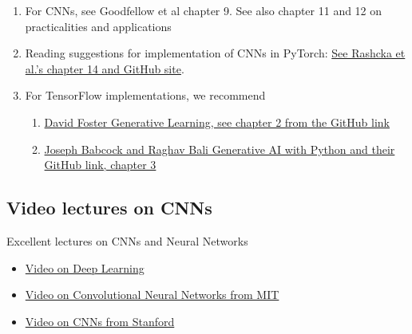 \documentclass[%
oneside,                 %
final,                   %
10pt]{article}
\begin{document}
\begin{block}{}
\begin{enumerate}
\item For CNNs, see Goodfellow et al chapter 9. See also chapter 11 and 12 on practicalities and applications

\item Reading suggestions for implementation of CNNs in PyTorch: \href{{https://github.com/rasbt/machine-learning-book/tree/main/ch14}}{See Rashcka et al.'s chapter 14 and GitHub site}. 

\item For TensorFlow implementations, we recommend
\begin{enumerate}

 \item \href{{https://github.com/davidADSP/Generative_Deep_Learning_2nd_Edition/tree/main/notebooks/02_deeplearning/02_cnn}}{David Foster Generative Learning, see chapter 2 from the GitHub link}

 \item \href{{https://github.com/raghavbali/generative_ai_with_tensorflow}}{Joseph Babcock and Raghav Bali Generative AI with Python and their GitHub link, chapter 3}  
\end{enumerate}

\noindent
\end{enumerate}

\noindent
\end{block}

\subsection{Video lectures on CNNs}
\begin{block}{Excellent lectures on CNNs and Neural Networks }
\begin{itemize}
\item \href{{https://www.youtube.com/playlist?list=PLZHQObOWTQDNU6R1_67000Dx_ZCJB-3pi}}{Video on Deep Learning}

\item \href{{https://www.youtube.com/watch?v=iaSUYvmCekI&ab_channel=AlexanderAmini}}{Video  on Convolutional Neural Networks from MIT}

\item \href{{https://www.youtube.com/watch?v=bNb2fEVKeEo&list=PLC1qU-LWwrF64f4QKQT-Vg5Wr4qEE1Zxk&index=6&ab_channel=StanfordUniversitySchoolofEngineering}}{Video on CNNs from Stanford}
\end{itemize}

\noindent
\end{block}
\end{document}
